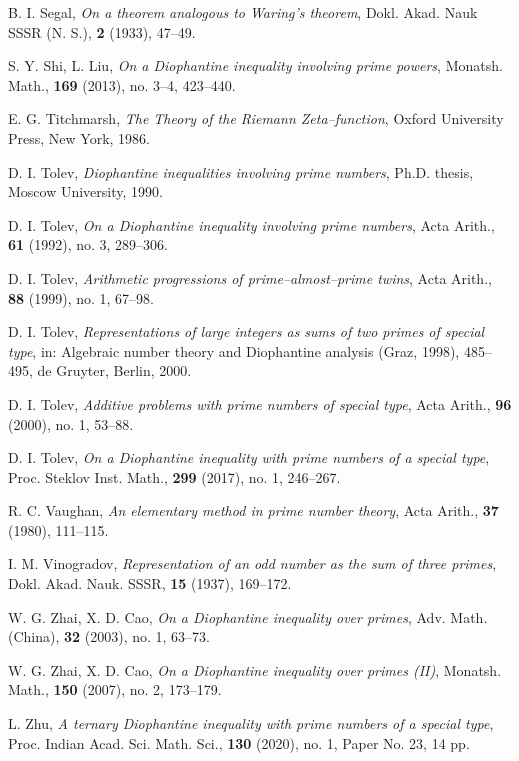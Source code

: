 \documentclass[a4paper,oneside,11pt]{article}%
\numberwithin{equation}{section}
\begin{document}
\begin{thebibliography}{99}
B. I. Segal, \textit{On a theorem analogous to Waring's theorem},
                                   Dokl. Akad. Nauk SSSR (N. S.), \textbf{2} (1933), 47--49.

S. Y. Shi, L. Liu, \textit{On a Diophantine inequality involving prime powers},
                                  Monatsh. Math., \textbf{169} (2013), no. 3--4, 423--440.

E. G. Titchmarsh, \textit{The Theory of the Riemann Zeta--function},
                               Oxford University Press, New York, 1986.

D. I. Tolev, \textit{Diophantine inequalities involving prime numbers},
                                Ph.D. thesis, Moscow University, 1990.

D. I. Tolev, \textit{On a Diophantine inequality involving prime numbers},
                                  Acta Arith., \textbf{61} (1992), no. 3, 289--306.

D. I. Tolev, \textit{Arithmetic progressions of prime--almost--prime twins},
                                  Acta Arith., \textbf{88} (1999), no. 1, 67--98.

D. I. Tolev, \textit{Representations of large integers as sums of two primes of special type},
                    in: Algebraic number theory and Diophantine analysis (Graz, 1998), 485--495, de Gruyter, Berlin, 2000.

D. I. Tolev, \textit{Additive problems with prime numbers of special type},
                                 Acta Arith., \textbf{96} (2000), no. 1, 53--88.

D. I. Tolev, \textit{On a Diophantine inequality with prime numbers of a special type},
                                 Proc. Steklov Inst. Math., \textbf{299} (2017), no. 1, 246--267.

R. C. Vaughan, \textit{An elementary method in prime number theory},
                                  Acta Arith., \textbf{37} (1980), 111--115.

I. M. Vinogradov, \textit{Representation of an odd number as the sum of three primes},
                                   Dokl. Akad. Nauk. SSSR, \textbf{15} (1937), 169--172.

W. G. Zhai, X. D. Cao, \textit{On a Diophantine inequality over primes},
                                    Adv. Math. (China), \textbf{32} (2003), no. 1, 63--73.

W. G. Zhai, X. D. Cao, \textit{On a Diophantine inequality over primes (II)},
                                    Monatsh. Math., \textbf{150} (2007), no. 2, 173--179.

L. Zhu, \textit{A ternary Diophantine inequality with prime numbers of a special type},
                          Proc. Indian Acad. Sci. Math. Sci., \textbf{130} (2020), no. 1, Paper No. 23, 14 pp.



\end{thebibliography}
\end{document}
